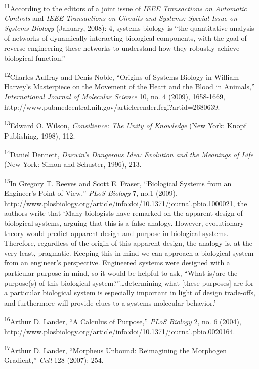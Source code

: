 \textsuperscript{11}According to the editors of a joint issue of
\textit{IEEE Transactions on Automatic Controls }and\textit{ IEEE
Transactions on Circuits and Systems: Special Issue on Systems Biology
}(January, 2008): 4, systems biology is “the quantitative analysis of
networks of dynamically interacting biological components, with the
goal of reverse engineering these networks to understand how they
robustly achieve biological function.”


\textsuperscript{12}Charles Auffray and Denis Noble, “Origins of Systems
Biology in William Harvey’s Masterpiece on the Movement of the Heart
and the Blood in Animals,”\textbf{ }\textit{International Journal of
Molecular Science }10, no. 4 (2009), 1658-1669,
http://www.pubmedcentral.nih.gov/articlerender.fcgi?artid=2680639.


\textsuperscript{13}Edward O. Wilson, \textit{Consilience: The Unity of
Knowledge} (New York: Knopf Publishing, 1998), 112.


\textsuperscript{14}Daniel Dennett, \textit{Darwin’s Dangerous Idea:
Evolution and the Meanings of Life} (New York: Simon and Schuster,
1996), 213.


\textsuperscript{15}In Gregory T. Reeves and Scott E. Fraser,
“Biological Systems from an Engineer’s Point of View,” \textit{PLoS
Biology} 7, no.1 (2009),
http://www.plosbiology.org/article/info:doi/10.1371/journal.pbio.1000021,
the authors write that ‘Many biologists have remarked on the apparent
design of biological systems, arguing that this is a false analogy.
However, evolutionary theory would predict apparent design and purpose
in biological systems. Therefore, regardless of the origin of this
apparent design, the analogy is, at the very least, pragmatic. Keeping
this in mind we can approach a biological system from an engineer’s
perspective. Engineered systems were designed with a particular purpose
in mind, so it would be helpful to ask, “What is/are the purpose(s) of
this biological system?”…determining what [these purposes] are for a
particular biological system is especially important in light of design
trade-offs, and furthermore will provide clues to a systems molecular
behavior.’


\textsuperscript{16}Arthur D. Lander, “A Calculus of Purpose,”
\textit{PLoS Biology} 2, no. 6 (2004),
http://www.plosbiology.org/article/info:doi/10.1371/journal.pbio.0020164.


\textsuperscript{17}Arthur D. Lander, “Morpheus Unbound: Reimagining the
Morphogen Gradient,” \textit{Cell} 128 (2007): 254.


